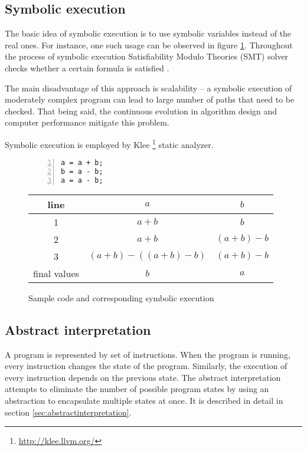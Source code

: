 \documentclass[12pt,final,oneside]{fithesis2}
\theoremstyle{definition}
\begin{document}
\subsection{Symbolic execution}

The basic idea of symbolic execution is to use symbolic variables instead of
the real ones. For instance, one such usage can be observed in
figure \ref{fig:se}. Throughout the process of symbolic execution
Satisfiability Modulo Theories (SMT) solver checks whether a certain formula
is satisfied \cite{Cadar11-1}.

The main disadvantage of this approach is scalability -- a symbolic
execution of moderately complex program can lead to large number of paths
that need to be checked. That being said, the continuous evolution in
algorithm design and computer performance mitigate this problem.

Symbolic execution is employed by Klee \footnote{\url{http://klee.llvm.org/}}
static analyzer.

\begin{figure}[ht]
\begin{minipage}{0.25\textwidth}
\begin{lstlisting}[numbers=left]
a = a + b;
b = a - b;
a = a - b;
\end{lstlisting}
\end{minipage}
\begin{minipage}{0.75\textwidth}
\begin{tabular}{c|c|c}
line & $a$                       & $b$ \\
\hline
1    & $a + b$                   & $b$ \\
2    & $a + b$                   & $(a + b) - b$ \\
3    & $(a + b) - ((a + b) - b)$ & $(a + b) - b$ \\
\hline \hline
final values & $b$             & $a$ \\
\end{tabular}
\end{minipage}
\caption{Sample code and corresponding symbolic execution}
\label{fig:se}
\end{figure}

\subsection{Abstract interpretation}

A program is represented by set of instructions. When the program is
running, every instruction changes the state of the program. Similarly,
the execution of every instruction depends on the previous state.
The abstract interpretation attempts to eliminate the number of possible
program states by using an abstraction to encapsulate multiple states at
once. It is described in detail in section \ref{sec:abstractinterpretation}.
\end{document}
